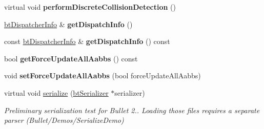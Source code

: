 \begin{DoxyCompactItemize}
\item 
\hypertarget{classbt_collision_world_a7bc2967b5005449b27f55545f224efcd}{virtual void {\bfseries perform\+Discrete\+Collision\+Detection} ()}\label{classbt_collision_world_a7bc2967b5005449b27f55545f224efcd}

\item 
\hypertarget{classbt_collision_world_aa6e0fa2c310419c6539a84df107a2ac0}{\hyperlink{structbt_dispatcher_info}{bt\+Dispatcher\+Info} \& {\bfseries get\+Dispatch\+Info} ()}\label{classbt_collision_world_aa6e0fa2c310419c6539a84df107a2ac0}

\item 
\hypertarget{classbt_collision_world_a45bdc41dd90bbeff57584e5f9da71c66}{const \hyperlink{structbt_dispatcher_info}{bt\+Dispatcher\+Info} \& {\bfseries get\+Dispatch\+Info} () const }\label{classbt_collision_world_a45bdc41dd90bbeff57584e5f9da71c66}

\item 
\hypertarget{classbt_collision_world_a1a7cc1a97f31d06ea843fd8398b9c16f}{bool {\bfseries get\+Force\+Update\+All\+Aabbs} () const }\label{classbt_collision_world_a1a7cc1a97f31d06ea843fd8398b9c16f}

\item 
\hypertarget{classbt_collision_world_a482d6276966521c8bf89513830e377a9}{void {\bfseries set\+Force\+Update\+All\+Aabbs} (bool force\+Update\+All\+Aabbs)}\label{classbt_collision_world_a482d6276966521c8bf89513830e377a9}

\item 
\hypertarget{classbt_collision_world_a152b79ca83fdb13ed7f1cc86ac214f66}{virtual void \hyperlink{classbt_collision_world_a152b79ca83fdb13ed7f1cc86ac214f66}{serialize} (\hyperlink{classbt_serializer}{bt\+Serializer} $\ast$serializer)}\label{classbt_collision_world_a152b79ca83fdb13ed7f1cc86ac214f66}

\begin{DoxyCompactList}\small\item\em Preliminary serialization test for Bullet 2.. Loading those files requires a separate parser (Bullet/\+Demos/\+Serialize\+Demo) \end{DoxyCompactList}\end{DoxyCompactItemize}
